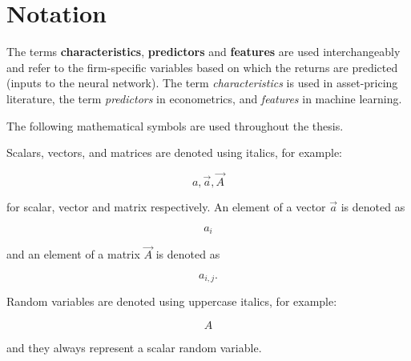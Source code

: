 \chapter*{Notation}

The terms \textbf{characteristics}, \textbf{predictors} and \textbf{features} are used interchangeably and refer to the firm-specific variables based on which the returns are predicted (inputs to the neural network). The term \textit{characteristics} is used in asset-pricing literature, the term \textit{predictors} in econometrics, and \textit{features} in machine learning. 

The following mathematical symbols are used throughout the thesis. 

Scalars, vectors, and matrices are denoted using italics, for example:

$$
a, \vec{a}, \vec{A}
$$

for scalar, vector and matrix respectively. An element of a vector $\vec{a}$ is denoted as

$$
a_i
$$

and an element of a matrix $\vec{A}$ is denoted as 

$$
a_{i,j}.
$$

Random variables are denoted using uppercase italics, for example:

$$
A
$$ 

and they always represent a scalar random variable.

 



